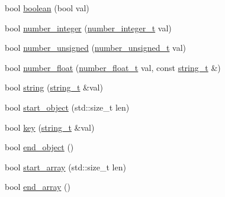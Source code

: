 \begin{DoxyCompactItemize}
\item 
bool \mbox{\hyperlink{classnlohmann_1_1detail_1_1json__sax__dom__callback__parser_ab7d8db672189164a8c0731e65ada1b45}{boolean}} (bool val)
\item 
bool \mbox{\hyperlink{classnlohmann_1_1detail_1_1json__sax__dom__callback__parser_a68d9eddfd572e8687c1c8107e0505aa6}{number\+\_\+integer}} (\mbox{\hyperlink{classnlohmann_1_1detail_1_1json__sax__dom__callback__parser_a3ba8fc7a8d83c5b0eeb3b543ad844b8d}{number\+\_\+integer\+\_\+t}} val)
\item 
bool \mbox{\hyperlink{classnlohmann_1_1detail_1_1json__sax__dom__callback__parser_acabb231463bf669441c22e4ea385a9fb}{number\+\_\+unsigned}} (\mbox{\hyperlink{classnlohmann_1_1detail_1_1json__sax__dom__callback__parser_a2406c5125f7128fb9c01921df2903001}{number\+\_\+unsigned\+\_\+t}} val)
\item 
bool \mbox{\hyperlink{classnlohmann_1_1detail_1_1json__sax__dom__callback__parser_ae21f7872c334c77d03ae033cb0749b1c}{number\+\_\+float}} (\mbox{\hyperlink{classnlohmann_1_1detail_1_1json__sax__dom__callback__parser_a914ea0555cea5290449fb791ae41c655}{number\+\_\+float\+\_\+t}} val, const \mbox{\hyperlink{classnlohmann_1_1detail_1_1json__sax__dom__callback__parser_a00e7d95d82d5d8a43421526a42a8eabc}{string\+\_\+t}} \&)
\item 
bool \mbox{\hyperlink{classnlohmann_1_1detail_1_1json__sax__dom__callback__parser_ad94e912a67c7b96158937236805b8b47}{string}} (\mbox{\hyperlink{classnlohmann_1_1detail_1_1json__sax__dom__callback__parser_a00e7d95d82d5d8a43421526a42a8eabc}{string\+\_\+t}} \&val)
\item 
bool \mbox{\hyperlink{classnlohmann_1_1detail_1_1json__sax__dom__callback__parser_a040e60243cc7c18a6078c6b83cdb4a81}{start\+\_\+object}} (std\+::size\+\_\+t len)
\item 
bool \mbox{\hyperlink{classnlohmann_1_1detail_1_1json__sax__dom__callback__parser_a0cc4a5192fe9b803276edb831b6099fa}{key}} (\mbox{\hyperlink{classnlohmann_1_1detail_1_1json__sax__dom__callback__parser_a00e7d95d82d5d8a43421526a42a8eabc}{string\+\_\+t}} \&val)
\item 
bool \mbox{\hyperlink{classnlohmann_1_1detail_1_1json__sax__dom__callback__parser_ae75d313d6d1b9c29508e740a10fefa18}{end\+\_\+object}} ()
\item 
bool \mbox{\hyperlink{classnlohmann_1_1detail_1_1json__sax__dom__callback__parser_a5255b98ba8282e3625968f91cff9d3d0}{start\+\_\+array}} (std\+::size\+\_\+t len)
\item 
bool \mbox{\hyperlink{classnlohmann_1_1detail_1_1json__sax__dom__callback__parser_aa64e7a650952174037d32028de582c12}{end\+\_\+array}} ()

\end{DoxyCompactItemize}
